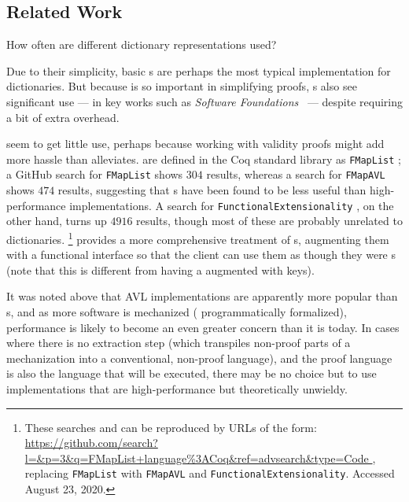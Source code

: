 \subsection{Related Work}
\label{sec:Discussion:Related}

How often are different dictionary representations used?

%
Due to their simplicity, basic {\sal}s are perhaps the most typical implementation for dictionaries.
%
But because \SemInj{} is so important in simplifying proofs, {\fpf}s also see significant use --- in key works such as \emph{Software Foundations}~\cite[Maps]{Pierce:SF1} --- despite requiring a bit of extra overhead.

\Cals{} seem to get little use, perhaps because working with validity proofs might add more hassle than \SemInj{} alleviates.
%
\Cals{} are defined in the Coq standard library as \texttt{FMapList} \citep{FMapList}; a GitHub search for \texttt{FMapList} shows $304$ results,
%
whereas a search for \texttt{FMapAVL} shows $474$ results, suggesting that {\cal}s have been found to be less useful than high-performance implementations.
%
A search for \texttt{FunctionalExtensionality} \citep{FunExt}, on the other hand, turns up $4916$ results, though most of these are probably unrelated to dictionaries.%
\footnote{\hspace{0.01in}%
%
These searches and can be reproduced by URLs of the form:
\url{https://github.com/search?l=\&p=3\&q=FMapList+language\%3ACoq\&ref=advsearch\&type=Code },
replacing \texttt{FMapList} with \texttt{FMapAVL} and \texttt{FunctionalExtensionality}.
%
Accessed August 23, 2020.
%
}
%
\citet{Amorim:fmap} provides a more comprehensive treatment of {\cal}s, augmenting them with a functional interface so that the client can
%
use them as though they were {\fpf}s (note that this is different from having a \fpf{} augmented with keys).


%
It was noted above that AVL implementations are apparently more popular than {\cal}s, and as more software is mechanized (\ie{} programmatically formalized), performance is likely to become an
%
even greater concern than it is today. In cases where there is no extraction step (which transpiles non-proof parts of a mechanization into a conventional, non-proof language), and the proof language is also the language that will be executed,
%
there may be no choice but to use implementations that are high-performance but theoretically unwieldy.

